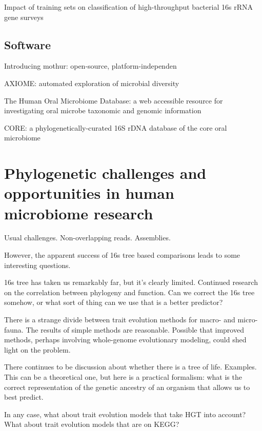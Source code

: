 \documentclass{amsart}
\begin{document}
\cite{werner2011impact}
Impact of training sets on classification of high-throughput bacterial 16s rRNA gene surveys



\subsection{Software}
\cite{caporaso2010qiime}

\cite{schloss2009introducing}
Introducing mothur: open-source, platform-independen

\cite{lynch2013axiome}
AXIOME: automated exploration of microbial diversity

\cite{chen2010human}
The Human Oral Microbiome Database: a web accessible resource for investigating oral microbe taxonomic and genomic information

\cite{griffen2011core}
CORE: a phylogenetically-curated 16S rDNA database of the core oral microbiome

\cite{srinivasan2012bacterial}


\section{Phylogenetic challenges and opportunities in human microbiome research}

Usual challenges.
Non-overlapping reads.
Assemblies.

However, the apparent success of 16s tree based comparisons leads to some interesting questions.

16s tree has taken us remarkably far, but it's clearly limited.
Continued research on the correlation between phylogeny and function.
Can we correct the 16s tree somehow, or what sort of thing can we use that is a better predictor?

There is a strange divide between trait evolution methods for macro- and micro-fauna.
The results of simple methods are reasonable.
Possible that improved methods, perhaps involving whole-genome evolutionary modeling, could shed light on the problem.

There continues to be discussion about whether there is a tree of life.
Examples.
This can be a theoretical one, but here is a practical formalism: what is the correct representation of the genetic ancestry of an organism that allows us to best predict.

In any case, what about trait evolution models that take HGT into account?
What about trait evolution models that are on KEGG?
\end{document}

